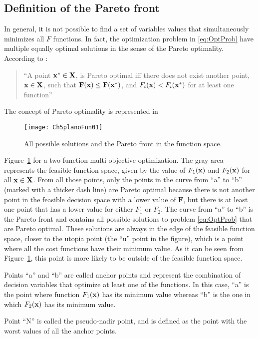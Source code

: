 \subsection{Definition of the Pareto front}
In general, it is not possible to find a set of variables values that simultaneously minimizes all $F$ functions. In fact, the optimization problem in \eqref{eq:OptProb} have multiple equally optimal solutions in the sense of the Pareto optimality. According to \citet{Marler2004}:
\begin{quote}
	``A point $\mathbf{x}^*\in \mathbf{X}$, is Pareto optimal iff there does not exist another point, $\mathbf{x} \in \mathbf{X}$, such that $\mathbf{F}(\mathbf{x})\leq\mathbf{F}(\mathbf{x}^*)$, and $F_i(\mathbf{x})<F_i(\mathbf{x}^*)$ for at least one function''
\end{quote}

The concept of Pareto optimality is represented in %
%
\begin{figure}[tb]
	\centering
	\texttt{[image: Ch5planoFun01]}
	\caption{All possible solutions and the Pareto front in the function space.}
	\label{fig:planoFun01}
\end{figure}
%
Figure~\ref{fig:planoFun01} for a two-function multi-objective optimization. The gray area represents the feasible function space, given by the value of $F_1(\mathbf{x})$ and $F_2(\mathbf{x})$ for all $\mathbf{x} \in \mathbf{X}$. From all those points, only the points in the curve from ``a'' to ``b'' (marked with a thicker dash line) are Pareto optimal because there is not another point in the feasible decision space with a lower value of $\mathbf{F}$, but there is at least one point that has a lower value for either $F_1$ or $F_2$. The curve from ``a'' to ``b'' is the Pareto front and contains all possible solutions to problem \eqref{eq:OptProb} that are Pareto optimal. These solutions are always in the edge of the feasible function space, closer to the utopia point (the ``u'' point in the figure), which is a point where all the cost functions have their minimum value. As it can be seen from Figure~\ref{fig:planoFun01}, this point is more likely to be outside of the feasible function space.

Points ``a'' and ``b'' are called anchor points and represent the combination of decision variables that optimize at least one of the functions. In this case, ``a'' is the point where function $F_1(\mathbf{x})$ has its minimum value whereas ``b'' is the one in which $F_2(\mathbf{x})$ has its minimum value.

Point ``N'' is called the pseudo-nadir point, and is defined as the point with the worst values of all the anchor points.

